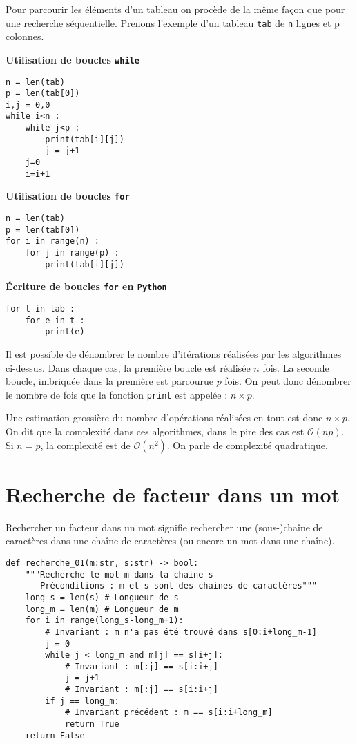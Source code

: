 Pour parcourir les éléments d'un tableau on procède de la même façon que pour une recherche séquentielle. Prenons l'exemple d'un tableau \texttt{tab} de \texttt{n} lignes et {p} colonnes.

\textbf{Utilisation de boucles \texttt{while}}
\begin{lstlisting}
n = len(tab)
p = len(tab[0])
i,j = 0,0
while i<n :
    while j<p :
        print(tab[i][j])
        j = j+1
    j=0
    i=i+1
\end{lstlisting}

\textbf{Utilisation de boucles \texttt{for}}
\begin{lstlisting}
n = len(tab)
p = len(tab[0])
for i in range(n) :
    for j in range(p) :
        print(tab[i][j])
\end{lstlisting}

\textbf{Écriture de boucles \texttt{for} en \texttt{Python}}
\begin{lstlisting}
for t in tab :
    for e in t :
        print(e)
\end{lstlisting}

\begin{rem}
Il est possible de dénombrer le nombre d'itérations réalisées par les algorithmes ci-dessus. Dans chaque cas, la première boucle est réalisée $n$ fois. La seconde boucle, imbriquée dans la première est parcourue $p$ fois. 
On peut donc dénombrer le nombre de fois que la fonction \texttt{print} est appelée : $n\times p$. 

Une estimation grossière du nombre d'opérations réalisées en tout est donc  $n\times p$. On dit que la complexité dans ces algorithmes, dans le pire des cas est $\mathcal{O}\left(np\right)$. Si $n=p$, la complexité est de $\mathcal{O}\left(n^2\right)$. On parle de complexité quadratique. 

\end{rem}
 

\section{Recherche de facteur dans un mot}
Rechercher un facteur dans un mot signifie rechercher une (sous-)chaîne de caractères dans une chaîne de caractères (ou encore un mot dans une chaîne).
\begin{lstlisting}
def recherche_01(m:str, s:str) -> bool:
    """Recherche le mot m dans la chaine s
       Préconditions : m et s sont des chaines de caractères"""
    long_s = len(s) # Longueur de s
    long_m = len(m) # Longueur de m
    for i in range(long_s-long_m+1): 
        # Invariant : m n'a pas été trouvé dans s[0:i+long_m-1]
        j = 0
        while j < long_m and m[j] == s[i+j]:
            # Invariant : m[:j] == s[i:i+j]
            j = j+1
            # Invariant : m[:j] == s[i:i+j]
        if j == long_m:
            # Invariant précédent : m == s[i:i+long_m]
            return True
    return False
\end{lstlisting}


